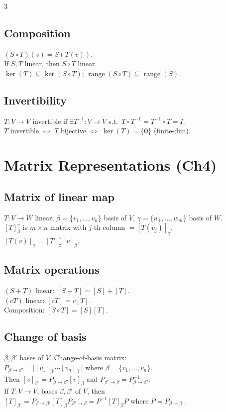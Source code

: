 \documentclass[10pt]{article}
\newcommand{\Ker}{\operatorname{ker}}
\newcommand{\Range}{\operatorname{range}}
\begin{document}
\begin{multicols}{3}
\subsection*{Composition}
$(S\circ T)(v)=S(T(v))$.\\
If $S,T$ linear, then $S\circ T$ linear.\\
$\Ker(T)\subseteq\Ker(S\circ T)$; $\Range(S\circ T)\subseteq\Range(S)$.

\subsection*{Invertibility}
$T:V\to V$ invertible if $\exists T^{-1}:V\to V$ s.t.\ $T\circ T^{-1}=T^{-1}\circ T=I$.\\
$T$ invertible $\Leftrightarrow$ $T$ bijective $\Leftrightarrow$ $\Ker(T)=\{\bm{0}\}$ (finite-dim).

\section*{Matrix Representations (Ch4)}

\subsection*{Matrix of linear map}
$T:V\to W$ linear, $\beta=\{v_1,\ldots,v_n\}$ basis of $V$, $\gamma=\{w_1,\ldots,w_m\}$ basis of $W$.\\
$[T]_\beta^\gamma$ is $m\times n$ matrix with $j$-th column $=[T(v_j)]_\gamma$.\\
$[T(v)]_\gamma=[T]_\beta^\gamma[v]_\beta$.

\subsection*{Matrix operations}
$(S+T)$ linear: $[S+T]=[S]+[T]$.\\
$(cT)$ linear: $[cT]=c[T]$.\\
Composition: $[S\circ T]=[S][T]$.

\subsection*{Change of basis}
$\beta,\beta'$ bases of $V$. Change-of-basis matrix:\\
$P_{\beta\to\beta'}=\big[[v_1]_{\beta'}\cdots[v_n]_{\beta'}\big]$ where $\beta=\{v_1,\ldots,v_n\}$.\\
Then $[v]_{\beta'}=P_{\beta\to\beta'}[v]_\beta$ and $P_{\beta'\to\beta}=P_{\beta\to\beta'}^{-1}$.\\
If $T:V\to V$, bases $\beta,\beta'$ of $V$, then\\
$[T]_{\beta'}=P_{\beta\to\beta'}[T]_\beta P_{\beta'\to\beta}=P^{-1}[T]_\beta P$ where $P=P_{\beta\to\beta'}$.


\end{multicols}
\end{document}
